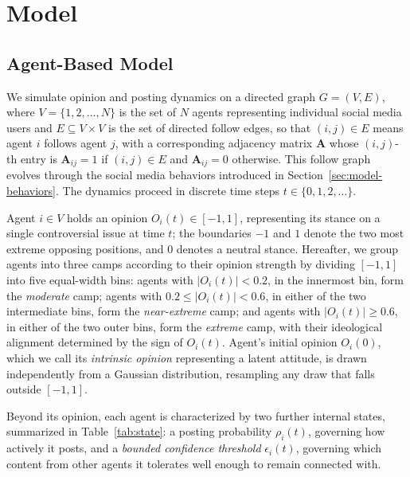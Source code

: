 \documentclass{svproc}
\def\post{\rho}                 %
\def\BoundedConfidence{\epsilon} %
\begin{document}
\section{Model}\label{sec:model}
\subsection{Agent-Based Model}\label{sec:model-abm}

We simulate opinion and posting dynamics on a directed graph
$G=(V,E)$, where $V=\{1,2,\dots,N\}$ is the set of $N$ agents
representing individual social media users and $E\subseteq V\times V$
is the set of directed follow edges, so that $(i,j)\in E$ means agent
$i$ follows agent $j$, with a corresponding adjacency matrix
$\mathbf{A}$ whose $(i, j)$-th entry is $\mathbf{A}_{ij}=1$ if
$(i,j)\in E$ and $\mathbf{A}_{ij}=0$ otherwise. This follow graph
evolves through the 
social media behaviors introduced in
Section~\ref{sec:model-behaviors}. The dynamics proceed in discrete
time steps $t\in\{0,1,2,\dots\}$.
\par

Agent $i\in V$ holds an opinion $O_i(t)\in[-1,1]$, representing
its stance on a single controversial issue at time $t$; the boundaries
$-1$ and $1$ denote the two most extreme opposing positions, and $0$
denotes a neutral stance. Hereafter, we group agents into three camps
according to their opinion strength by dividing $[-1,1]$ into five
equal-width bins: agents with $\vert O_i(t)\vert <0.2$, in the
innermost bin, form the \emph{moderate} camp; agents with
$0.2\le\vert O_i(t)\vert<0.6$, in either of the two intermediate
bins, form the \emph{near-extreme} camp; and agents with
$\vert O_i(t)\vert\ge0.6$, in either of the two outer bins, form
the \emph{extreme} camp, with their ideological alignment determined
by the sign of $O_i(t)$.
Agent's initial opinion $O_i(0)$, which
we call its \emph{intrinsic opinion} representing a latent attitude,
is drawn independently from a Gaussian distribution, resampling any
draw that falls outside $[-1,1]$.
\par


Beyond its opinion, each agent is characterized by two further
internal states, summarized in Table~\ref{tab:state}: a posting
probability $\post_i(t)$, governing how actively it posts, and a
{\em bounded confidence threshold} $\BoundedConfidence_i(t)$, governing
which content from other agents it tolerates well enough to remain
connected with.
\par
\end{document}
